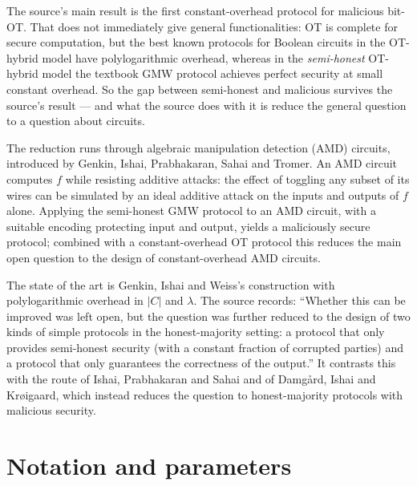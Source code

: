 \documentclass{aicr-conjecture}
\begin{document}
The source's main result is the first constant-overhead protocol for
malicious bit-OT\@. That does not immediately give general functionalities:
OT is complete for secure computation, but the best known protocols for
Boolean circuits in the OT-hybrid model have polylogarithmic overhead,
whereas in the \emph{semi-honest} OT-hybrid model the textbook GMW
protocol achieves perfect security at small constant overhead. So the
gap between semi-honest and malicious survives the source's result --- and
what the source does with it is reduce the general question to a
question about circuits.

The reduction runs through algebraic manipulation detection (AMD)
circuits, introduced by Genkin, Ishai, Prabhakaran, Sahai and Tromer. An
AMD circuit computes $f$ while resisting additive attacks: the effect of
toggling any subset of its wires can be simulated by an ideal additive
attack on the inputs and outputs of $f$ alone. Applying the semi-honest
GMW protocol to an AMD circuit, with a suitable encoding protecting input
and output, yields a maliciously secure protocol; combined with a
constant-overhead OT protocol this reduces the main open question to the
design of constant-overhead AMD circuits.

The state of the art is Genkin, Ishai and Weiss's construction with
polylogarithmic overhead in $|C|$ and $\lambda$. The source records:
``Whether this can be improved was left open, but the question was
further reduced to the design of two kinds of simple protocols in the
honest-majority setting: a protocol that only provides semi-honest
security (with a constant fraction of corrupted parties) and a protocol
that only guarantees the correctness of the output.'' It contrasts this
with the route of Ishai, Prabhakaran and Sahai and of Damg\aa{}rd, Ishai
and Kr\o{}igaard, which instead reduces the question to honest-majority
protocols with malicious security.

\section{Notation and parameters}\label{sec:notation}
\end{document}
